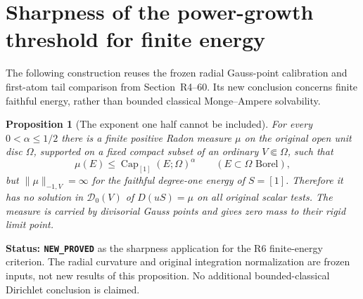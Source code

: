 \documentclass[11pt,a4paper]{article}
\numberwithin{equation}{section}
\newtheorem{proposition}[theorem]{Proposition}
\theoremstyle{definition}
\theoremstyle{remark}
\begin{document}


\section{Sharpness of the power-growth threshold for finite energy}
\label{sec:r6-energy-threshold-obstruction}

The following construction reuses the frozen radial Gauss-point
calibration and first-atom tail comparison from
Section~\textup{R4--60}. Its new conclusion
concerns finite faithful energy, rather than bounded classical
Monge--Ampere solvability.

\begin{proposition}[The exponent one half cannot be included]
\label{prop:r6-half-power-infinite-energy}
For every $0<\alpha\le1/2$ there is a finite positive Radon measure
$\mu$ on the original open unit disc $\Omega$, supported on a fixed
compact subset of an ordinary $V\Subset\Omega$, such that
\begin{equation}
                   \mu(E)\le\operatorname{Cap}_{[1]}(E;\Omega)^\alpha
                         \qquad(E\subset\Omega\text{ Borel}),
 \label{eq:r6-low-power-capacity-bound}
\end{equation}
but $\|\mu\|_{-1,V}=\infty$ for the faithful degree-one energy of
$S=[1]$. Therefore it has no solution in $\mathscr D_0(V)$ of
$D(uS)=\mu$ on all original scalar tests. The measure is carried by
divisorial Gauss points and gives zero mass to their rigid limit point.
\end{proposition}

\noindent\textbf{Status: \texttt{NEW\_PROVED}} as the sharpness
application for the R6 finite-energy criterion. The radial curvature
and original integration normalization are frozen inputs, not new
results of this proposition. No additional bounded-classical
Dirichlet conclusion is claimed.
\end{document}
